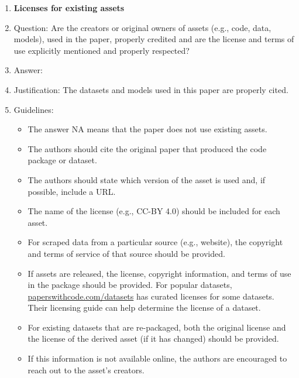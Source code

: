 \documentclass{article}
\begin{document}
\begin{enumerate}
\item {\bf Licenses for existing assets}
    \item[] Question: Are the creators or original owners of assets (e.g., code, data, models), used in the paper, properly credited and are the license and terms of use explicitly mentioned and properly respected?
    \item[] Answer: \answerYes{} %
    \item[] Justification: The datasets and models used in this paper are properly cited.
    \item[] Guidelines:
    \begin{itemize}
        \item The answer NA means that the paper does not use existing assets.
        \item The authors should cite the original paper that produced the code package or dataset.
        \item The authors should state which version of the asset is used and, if possible, include a URL.
        \item The name of the license (e.g., CC-BY 4.0) should be included for each asset.
        \item For scraped data from a particular source (e.g., website), the copyright and terms of service of that source should be provided.
        \item If assets are released, the license, copyright information, and terms of use in the package should be provided. For popular datasets, \url{paperswithcode.com/datasets} has curated licenses for some datasets. Their licensing guide can help determine the license of a dataset.
        \item For existing datasets that are re-packaged, both the original license and the license of the derived asset (if it has changed) should be provided.
        \item If this information is not available online, the authors are encouraged to reach out to the asset's creators.
    \end{itemize}


\end{enumerate}
\end{document}
